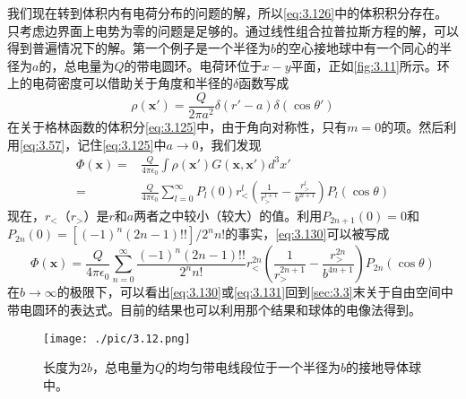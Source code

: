 \documentclass[12pt]{book}
\numberwithin{equation}{chapter}
\numberwithin{figure}{chapter}
\numberwithin{footnote}{page}
\begin{document}
我们现在转到体积内有电荷分布的问题的解，所以\autoref{eq:3.126}中的体积积分存在。只考虑边界面上电势为零的问题是足够的。通过线性组合拉普拉斯方程的解，可以得到普遍情况下的解。第一个例子是一个半径为$b$的空心接地球中有一个同心的半径为$a$的，总电量为$Q$的带电圆环。电荷环位于$x-y$平面，正如\autoref{fig:3.11}所示。环上的电荷密度可以借助关于角度和半径的$\delta$函数写成
\begin{equation}\label{eq:3.129}
    \rho(\mathbf{x'})=\frac{Q}{2\pi a^2}\delta(r'-a)\delta(\cos\theta')
\end{equation}
在关于格林函数的体积分\autoref{eq:3.125}中，由于角向对称性，只有$m=0$的项。然后利用\autoref{eq:3.57}，记住\autoref{eq:3.125}中$a\to0$，我们发现
\begin{equation}\label{eq:3.130}
    \begin{aligned}
        \Phi(\mathbf{x})=&\frac{Q}{4\pi\epsilon_0}\int \rho(\mathbf{x'})G(\mathbf{x},\mathbf{x'})d^3x'\\
        =&\frac{Q}{4\pi\epsilon_0}\sum_{l=0}^\infty P_l(0)r_<^l(\frac{1}{r_>^{l+1}}-\frac{r_>^l}{b^{2l+1}})P_l(\cos\theta)
    \end{aligned}
\end{equation}
现在，$r_<$（$r_>$）是$r$和$a$两者之中较小（较大）的值。利用$P_{2n+1}(0)=0$和$P_{2n}(0)=[(-1)^n(2n-1)!!]/2^n n!$的事实，\autoref{eq:3.130}可以被写成
\begin{equation}\label{eq:3.131}
    \Phi(\mathbf{x})=\frac{Q}{4\pi\epsilon_0}\sum_{n=0}^\infty\frac{(-1)^n(2n-1)!!}{2^n n!}r_<^{2n}(\frac{1}{r_>^{2n+1}}-\frac{r_>^{2n}}{b^{4n+1}})P_{2n}(\cos\theta)
\end{equation}
在$b\to\infty$的极限下，可以看出\autoref{eq:3.130}或\autoref{eq:3.131}回到\autoref{sec:3.3}末关于自由空间中带电圆环的表达式。目前的结果也可以利用那个结果和球体的电像法得到。

\begin{figure}[!ht]
    \centering
    \texttt{[image: ./pic/3.12.png]}
    \captionsetup{justification=raggedright, singlelinecheck=false}
    \caption{长度为$2b$，总电量为$Q$的均匀带电线段位于一个半径为$b$的接地导体球中。}
    \label{fig:3.12}
\end{figure}
\end{document}
